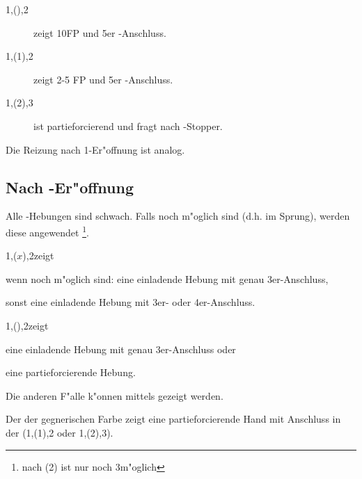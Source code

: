 \begin{description}
\item[1\kar{}\sep(\kontra){}\sep2\kar] zeigt 10\pl FP und 5\pl{}er
  \ka-Anschluss.
\item[1\tre{}\sep(1\pik){}\sep2\SA] zeigt 2-5 FP und 5\pl{}er
  \tr-Anschluss.
\item[1\kar{}\sep(2\tre){}\sep3\tre] ist partieforcierend und fragt nach
  \tr-Stopper.
\end{description}

Die Reizung nach 1\kar-Er"offnung ist analog.

\subsection{Nach \of-Er"offnung}
\begin{compactitem}
\item Alle \ofa-Hebungen sind schwach.  Falls 
  noch m"oglich sind (d.h. im Sprung), werden diese angewendet%
  \footnote{nach (2\tre) ist nur noch 3\kar m"oglich}.
\item 1\of{}\sep($x$){}\sep2\SA zeigt
  \begin{compactitem}
  \item wenn  noch m"oglich sind: eine einladende
    Hebung mit genau 3er-Anschluss,
  \item sonst eine einladende Hebung mit 3er- oder 4er-Anschluss.
  \end{compactitem}
\item 1\of{}\sep(\kontra){}\sep2\SA zeigt
  \begin{compactitem}
    \item eine einladende Hebung mit genau 3er-Anschluss oder
    \item eine partieforcierende Hebung.
  \end{compactitem}
Die anderen F"alle k"onnen mittels  gezeigt werden.
\item Der  der gegnerischen Farbe zeigt eine
  partieforcierende Hand mit Anschluss in der \ofa
  (1\of{}\sep(1\anybid){}\sep2\anybid{} oder
1\of{}\sep(2\anybid){}\sep3\anybid{}).
\end{compactitem}


